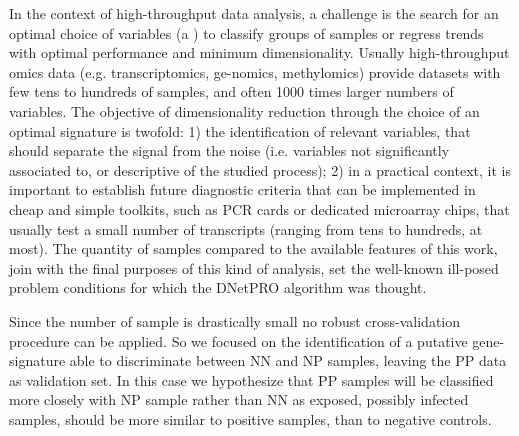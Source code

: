 \documentclass{standalone}
\begin{document}
In the context of high-throughput data analysis, a challenge is the search for an optimal choice of variables (a ) to classify groups of samples or regress trends with optimal performance and minimum dimensionality.
Usually high-throughput omics data (e.g. transcriptomics, ge-nomics, methylomics) provide datasets with few tens to hundreds of samples, and often 1000 times larger numbers of variables.
The objective of dimensionality reduction through the choice of an optimal signature is twofold: 1) the identification of relevant variables, that should separate the signal from the noise (i.e. variables not significantly associated to, or descriptive of the studied process); 2) in a practical context, it is important to establish future diagnostic criteria that can be implemented in cheap and simple toolkits, such as PCR cards or dedicated microarray chips, that usually test a small number of transcripts (ranging from tens to hundreds, at most).
The quantity of samples compared to the available features of this work, join with the final purposes of this kind of analysis, set the well-known ill-posed problem conditions for which the DNetPRO algorithm was thought.

Since the number of sample is drastically small no robust cross-validation procedure can be applied.
So we focused on the identification of a putative gene-signature able to discriminate between NN and NP samples, leaving the PP data as validation set.
In this case we hypothesize that PP samples will be classified more closely with NP sample rather than NN as exposed, possibly infected samples, should be more similar to positive samples, than to negative controls.




%
\end{document}

